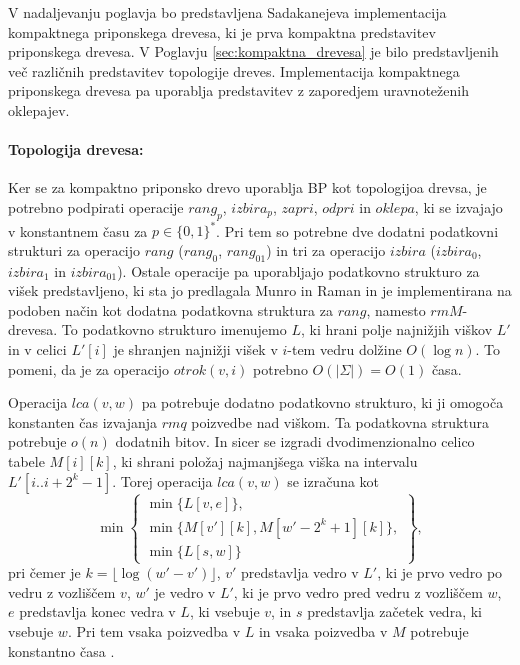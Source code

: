 V nadaljevanju poglavja bo predstavljena Sadakanejeva \cite{Sadakane2007} implementacija kompaktnega priponskega drevesa, ki je prva kompaktna predstavitev priponskega drevesa. V Poglavju \ref{sec:kompaktna_drevesa} je bilo predstavljenih več različnih predstavitev topologije dreves. Implementacija kompaktnega priponskega drevesa pa uporablja predstavitev z zaporedjem uravnoteženih oklepajev.

\paragraph{Topologija drevesa:}
Ker se za kompaktno priponsko drevo uporablja BP kot topologijoa drevsa, je potrebno podpirati operacije $rang_p$, $izbira_p$, $zapri$, $odpri$ in $oklepa$, ki se izvajajo v konstantnem času za $p\in\{0,1\} ^*$. Pri tem so potrebne dve dodatni podatkovni strukturi za operacijo $rang$ ($rang_0$, $rang_{01}$) in tri za operacijo $izbira$ ($izbira_0$, $izbira_1$ in $izbira_{01}$). Ostale operacije pa uporabljajo podatkovno strukturo za višek predstavljeno, ki sta jo predlagala Munro in Raman \cite{Munro1997} in je implementirana na podoben način kot dodatna podatkovna struktura za $rang$, namesto $rmM$-drevesa. To podatkovno strukturo imenujemo $L$, ki hrani polje najnižjih viškov $L'$ in v celici $L'[i]$ je shranjen najnižji višek v $i$-tem vedru dolžine $O(\log{n})$. To pomeni, da je za operacijo $otrok(v,i)$ potrebno $O(|\Sigma|)=O(1)$ časa. 

Operacija $lca(v,w)$ pa potrebuje dodatno podatkovno strukturo, ki ji omogoča konstanten čas izvajanja $rmq$ poizvedbe nad viškom. Ta podatkovna struktura potrebuje $o(n)$ dodatnih bitov. In sicer se izgradi dvodimenzionalno celico tabele $M[i][k]$, ki shrani položaj najmanjšega viška na intervalu $L'[i..i+2^k-1]$. Torej operacija $lca(v,w)$ se izračuna kot
\begin{equation*}
    \min\left\{
    \begin{array}{l}
        \min\{L[v,e]\},\\ 
        \min\{M[v'][k],M[w'-2^k+1][k]\},\\
        \min\{L[s,w]\}
    \end{array}\right\},
\end{equation*}
pri čemer je $k=\lfloor \log{(w'-v')\rfloor}$, $v'$ predstavlja vedro v $L'$, ki je prvo vedro po vedru z vozliščem $v$, $w'$ je vedro v $L'$, ki je prvo vedro pred vedru z vozliščem $w$, $e$ predstavlja konec vedra v $L$, ki vsebuje $v$, in $s$ predstavlja začetek vedra, ki vsebuje $w$. Pri tem vsaka poizvedba v $L$ in vsaka poizvedba v $M$ potrebuje konstantno časa \cite{Sadakane2007,Valimaki2007}. 


